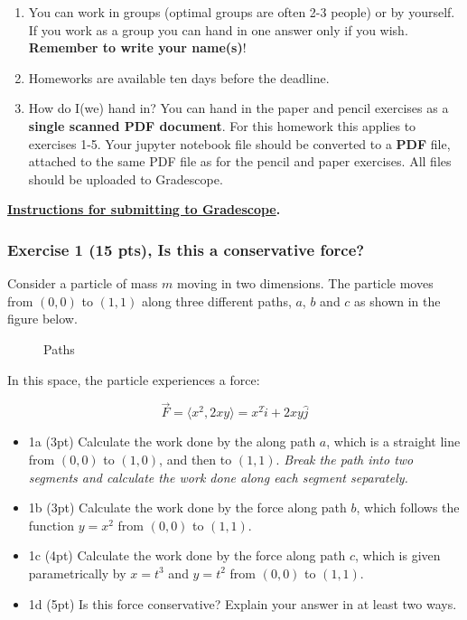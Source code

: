 \documentclass[11pt]{article}
\makeatletter
\providecommand{\tightlist}{%
      \setlength{\itemsep}{0pt}\setlength{\parskip}{0pt}}
\newcommand*\pandocbounded[1]{%
      \sbox\pandoc@box{#1}%
      \Gscale@div\@tempa\textheight{\dimexpr\ht\pandoc@box+\dp\pandoc@box\relax}%
      \Gscale@div\@tempb\linewidth{\wd\pandoc@box}%
      \ifdim\@tempb\p@<\@tempa\p@
        \let\@tempa\@tempb
      \fi
      \ifdim\@tempa\p@<\p@
        \scalebox{\@tempa}{\usebox\pandoc@box}%
      \else
        \usebox{\pandoc@box}%
      \fi
    }
\makeatother
\begin{document}
\begin{enumerate}
\def\labelenumi{\arabic{enumi}.}
\item
  You can work in groups (optimal groups are often 2-3 people) or by
  yourself. If you work as a group you can hand in one answer only if
  you wish. \textbf{Remember to write your name(s)}!
\item
  Homeworks are available ten days before the deadline.
\item
  How do I(we) hand in? You can hand in the paper and pencil exercises
  as a \textbf{single scanned PDF document}. For this homework this
  applies to exercises 1-5. Your jupyter notebook file should be
  converted to a \textbf{PDF} file, attached to the same PDF file as for
  the pencil and paper exercises. All files should be uploaded to
  Gradescope.
\end{enumerate}

\textbf{\href{../resources/gradescope-submissions.md}{Instructions for
submitting to Gradescope}.}

    \subsubsection{Exercise 1 (15 pts), Is this a conservative
force?}\label{exercise-1-15-pts-is-this-a-conservative-force}

Consider a particle of mass \(m\) moving in two dimensions. The particle
moves from \((0,0)\) to \((1,1)\) along three different paths, \(a\),
\(b\) and \(c\) as shown in the figure below.

\begin{figure}
\centering
\pandocbounded{\texttt{[image: ../images/hw4\_paths.png]}}
\caption{Paths}
\end{figure}

In this space, the particle experiences a force:

\[\vec{F} = \langle x^2, 2xy \rangle = x^2\hat{i} + 2xy \hat{j}\]

\begin{itemize}
\tightlist
\item
  1a (3pt) Calculate the work done by the along path \(a\), which is a
  straight line from \((0,0)\) to \((1,0)\), and then to \((1,1)\).
  \emph{Break the path into two segments and calculate the work done
  along each segment separately.}
\item
  1b (3pt) Calculate the work done by the force along path \(b\), which
  follows the function \(y = x^2\) from \((0,0)\) to \((1,1)\).
\item
  1c (4pt) Calculate the work done by the force along path \(c\), which
  is given parametrically by \(x = t^3\) and \(y = t^2\) from \((0,0)\)
  to \((1,1)\).
\item
  1d (5pt) Is this force conservative? Explain your answer in at least
  two ways.
\end{itemize}
\end{document}
